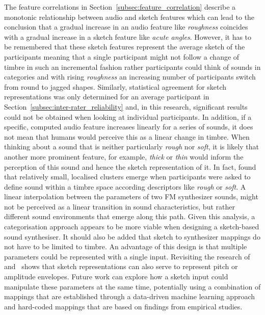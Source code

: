 \documentclass[]{interact}
\theoremstyle{plain}%
\theoremstyle{definition}
\theoremstyle{remark}
\begin{document}
The feature correlations in Section~\ref{subsec:feature_correlation} describe a monotonic relationship between audio and sketch features which can lead to the conclusion that a gradual increase in an audio feature like \textit{roughness} coincides with a gradual increase in a sketch feature like \textit{acute angles}. However, it has to be remembered that these sketch features represent the average sketch of the participants meaning that a single participant might not follow a change of timbre in such an incremental fashion rather participants could think of sounds in categories and with rising \textit{roughness} an increasing number of participants switch from round to jagged shapes. Similarly, statistical agreement for sketch representations was only determined for an average participant in Section~\ref{subsec:inter-rater_reliability} and, in this research, significant results could not be obtained when looking at individual participants. In addition, if a specific, computed audio feature increases linearly for a series of sounds, it does not mean that humans would perceive this as a linear change in timbre. When thinking about a sound that is neither particularly \textit{rough} nor \textit{soft}, it is likely that another more prominent feature, for example, \textit{thick} or \textit{thin} would inform the perception of this sound and hence the sketch representation of it. In fact,  found that relatively small, localised clusters emerge when participants were asked to define sound within a timbre space according descriptors like \textit{rough} or \textit{soft}. A linear interpolation between the parameters of two FM synthesizer sounds, might not be perceived as a linear transition in sound characteristics, but rather different sound environments that emerge along this path. Given this analysis, a categorisation approach appears to be more viable when designing a sketch-based sound synthesiser. It should also be added that sketch to synthesizer mappings do not have to be limited to timbre. An advantage of this design is that multiple parameters could be represented with a single input. Revisiting the research of~ and~ shows that sketch representations can also serve to represent pitch or amplitude envelopes. Future work can explore how a sketch input could manipulate these parameters at the same time, potentially using a combination of mappings that are established through a data-driven machine learning approach and hard-coded mappings that are based on findings from empirical studies. 
\end{document}
